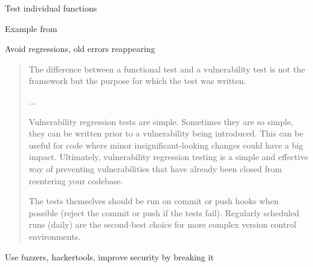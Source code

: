 \documentclass[Screen16to9,17pt]{foils}
\begin{document}
\begin{list1}
\item Test individual functions
\item Example from 
\item Avoid regressions, old errors reappearing
\end{list1}



\begin{quote}
The difference between a functional test and a vulnerability test is not the framework
but the purpose for which the test was written.

...

Vulnerability regression tests are simple. Sometimes they are so simple, they can be written prior to a vulnerability being introduced. This can be useful for code where minor insignificant-looking changes could have a big impact. Ultimately, vulnerability regression testing is a simple and effective way of preventing vulnerabilities that have already been closed from reentering your codebase.

The tests themselves should be run on commit or push hooks when possible (reject the commit or push if the tests fail). Regularly scheduled runs (daily) are the second-best choice for more complex version control environments.
\end{quote}







\centerline{Use fuzzers, hackertools, improve security by breaking it}


\end{document}
